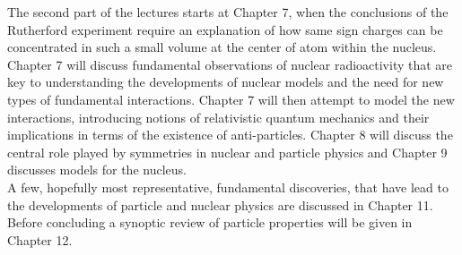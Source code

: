 The second part of the lectures starts at Chapter 7, when the conclusions of the Rutherford experiment require an explanation of how same sign charges can be concentrated in such a small volume at the center of atom within the nucleus. Chapter 7 will discuss fundamental observations of nuclear radioactivity that are key to understanding the developments of nuclear models and the need for new types of fundamental interactions. Chapter 7 will then attempt to model the new interactions, introducing notions of relativistic quantum mechanics and their implications in terms of the existence of anti-particles. Chapter 8 will discuss the central role played by symmetries in nuclear and particle physics and Chapter 9 discusses models for the nucleus. \\

A few, hopefully most representative, fundamental discoveries, that have lead to the developments of particle and nuclear physics are discussed in Chapter 11. Before concluding a synoptic review of particle properties will be given in Chapter 12.\\




 



